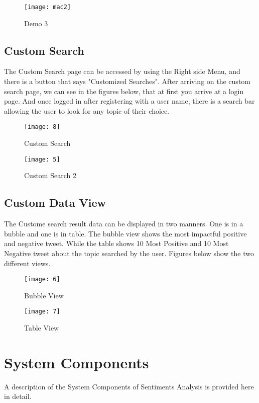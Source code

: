 \documentclass[12pt, titlepage]{article}
\begin{document}
\begin{figure}[H]
\centering
\texttt{[image: mac2]}
\caption{Demo 3}
\label{fig:Result}
\end{figure}


\subsection{Custom Search}
The Custom Search page can be accessed by using the Right side Menu, and there is a button that says "Customized Searches". After arriving on the custom search page, we can see in the figures below, that at first you arrive at a login page. And once logged in after registering with a user name, there is a search bar allowing the user to look for any topic of their choice.

\begin{figure}[H]
\centering
\texttt{[image: 8]}
\caption{Custom Search}
\label{fig:Result}
\end{figure}

\begin{figure}[H]
\centering
\texttt{[image: 5]}
\caption{Custom Search 2}
\label{fig:Result}
\end{figure}

\subsection{Custom Data View}
The Custome search result data can be displayed in two manners. One is in a bubble and one is in table. The bubble view shows the most impactful positive and negative tweet. While the table shows 10 Most Positive and 10 Most Negative tweet about the topic searched by the user. Figures below show the two different views. 

\begin{figure}[H]
\centering
\texttt{[image: 6]}
\caption{Bubble View}
\label{fig:Result}
\end{figure}

\begin{figure}[H]
\centering
\texttt{[image: 7]}
\caption{Table View}
\label{fig:Result}
\end{figure}

\iffalse
\newpage
\section{System Components}
A description of the System Components of Sentiments Analysis is provided here in detail. 
\end{document}
